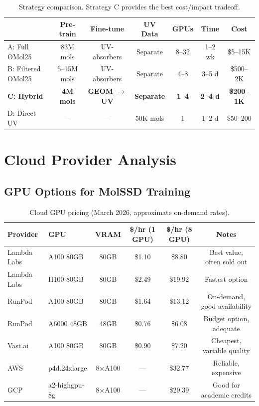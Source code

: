 \documentclass[11pt,a4paper]{article}
\begin{document}
\begin{table}[h]
\centering
\small
\begin{tabular}{@{}lcccccc@{}}
\toprule
& \textbf{Pre-train} & \textbf{Fine-tune} & \textbf{UV Data} &
\textbf{GPUs} & \textbf{Time} & \textbf{Cost} \\
\midrule
A: Full OMol25 & 83M mols & UV-absorbers & Separate & 8--32 & 1--2 wk & \$5--15K \\
B: Filtered OMol25 & 5--15M mols & UV-absorbers & Separate & 4--8 & 3--5 d & \$500--2K \\
\textbf{C: Hybrid} & \textbf{4M mols} & \textbf{GEOM $\to$ UV} &
\textbf{Separate} & \textbf{1--4} & \textbf{2--4 d} & \textbf{\$200--1K} \\
D: Direct UV & --- & --- & 50K mols & 1 & 1--2 d & \$50--200 \\
\bottomrule
\end{tabular}
\caption{Strategy comparison. Strategy C provides the best cost/impact tradeoff.}
\end{table}

\section{Cloud Provider Analysis}

\subsection{GPU Options for MolSSD Training}

\begin{table}[h]
\centering
\small
\begin{tabular}{@{}llcccc@{}}
\toprule
\textbf{Provider} & \textbf{GPU} & \textbf{VRAM} & \textbf{\$/hr (1 GPU)} &
\textbf{\$/hr (8 GPU)} & \textbf{Notes} \\
\midrule
Lambda Labs & A100 80GB & 80GB & \$1.10 & \$8.80 & Best value, often sold out \\
Lambda Labs & H100 80GB & 80GB & \$2.49 & \$19.92 & Fastest option \\
RunPod & A100 80GB & 80GB & \$1.64 & \$13.12 & On-demand, good availability \\
RunPod & A6000 48GB & 48GB & \$0.76 & \$6.08 & Budget option, adequate \\
Vast.ai & A100 80GB & 80GB & \$0.90 & \$7.20 & Cheapest, variable quality \\
AWS & p4d.24xlarge & 8$\times$A100 & --- & \$32.77 & Reliable, expensive \\
GCP & a2-highgpu-8g & 8$\times$A100 & --- & \$29.39 & Good for academic credits \\
\bottomrule
\end{tabular}
\caption{Cloud GPU pricing (March 2026, approximate on-demand rates).}
\end{table}
\end{document}
